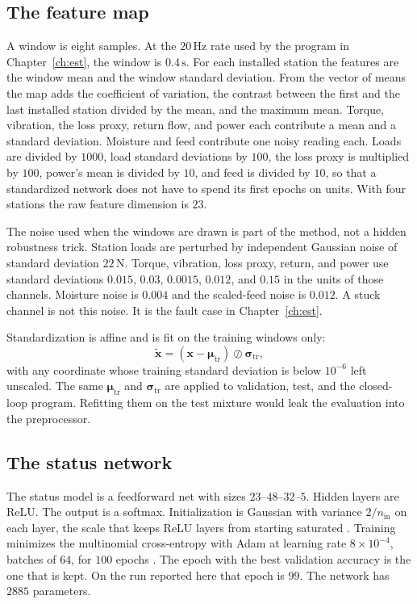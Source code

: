 \subsection{The feature map}

A window is eight samples. At the \(20\,\mathrm{Hz}\) rate used by the program in Chapter~\ref{ch:est}, the window is \(0.4\,\mathrm{s}\). For each installed station the features are the window mean and the window standard deviation. From the vector of means the map adds the coefficient of variation, the contrast between the first and the last installed station divided by the mean, and the maximum mean. Torque, vibration, the loss proxy, return flow, and power each contribute a mean and a standard deviation. Moisture and feed contribute one noisy reading each. Loads are divided by \(1000\), load standard deviations by \(100\), the loss proxy is multiplied by \(100\), power's mean is divided by \(10\), and feed is divided by \(10\), so that a standardized network does not have to spend its first epochs on units. With four stations the raw feature dimension is \(23\).

The noise used when the windows are drawn is part of the method, not a hidden robustness trick. Station loads are perturbed by independent Gaussian noise of standard deviation \(22\,\mathrm{N}\). Torque, vibration, loss proxy, return, and power use standard deviations \(0.015\), \(0.03\), \(0.0015\), \(0.012\), and \(0.15\) in the units of those channels. Moisture noise is \(0.004\) and the scaled-feed noise is \(0.012\). A stuck channel is not this noise. It is the fault case in Chapter~\ref{ch:est}.

Standardization is affine and is fit on the training windows only:
\begin{equation}
\tilde{\mathbf{x}} = (\mathbf{x}-\boldsymbol{\mu}_{\mathrm{tr}})\oslash \boldsymbol{\sigma}_{\mathrm{tr}},
\label{eq:std}
\end{equation}
with any coordinate whose training standard deviation is below \(10^{-6}\) left unscaled. The same \(\boldsymbol{\mu}_{\mathrm{tr}}\) and \(\boldsymbol{\sigma}_{\mathrm{tr}}\) are applied to validation, test, and the closed-loop program. Refitting them on the test mixture would leak the evaluation into the preprocessor.

\subsection{The status network}

The status model is a feedforward net with sizes \(23\)--\(48\)--\(32\)--\(5\). Hidden layers are ReLU. The output is a softmax. Initialization is Gaussian with variance \(2/n_{\mathrm{in}}\) on each layer, the scale that keeps ReLU layers from starting saturated \cite{he2015}. Training minimizes the multinomial cross-entropy with Adam at learning rate \(8\times 10^{-4}\), batches of \(64\), for \(100\) epochs \cite{kingma2015,rumelhart1986}. The epoch with the best validation accuracy is the one that is kept. On the run reported here that epoch is \(99\). The network has \(2885\) parameters.

